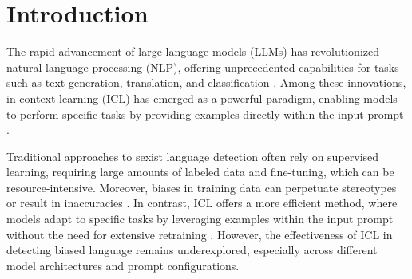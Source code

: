\documentclass[11pt]{article}
\begin{document}


\section{Introduction}
\label{sec:introduction}

The rapid advancement of large language models (LLMs) has revolutionized natural language processing (NLP), offering unprecedented capabilities for tasks such as text generation, translation, and classification \citep{brown2020language, devlin2019bert}. Among these innovations, in-context learning (ICL) has emerged as a powerful paradigm, enabling models to perform specific tasks by providing examples directly within the input prompt \citep{dong2022survey}.

Traditional approaches to sexist language detection often rely on supervised learning, requiring large amounts of labeled data and fine-tuning, which can be resource-intensive. Moreover, biases in training data can perpetuate stereotypes or result in inaccuracies \citep{gpt3}. In contrast, ICL offers a more efficient method, where models adapt to specific tasks by leveraging examples within the input prompt without the need for extensive retraining \citep{min2022rethinking, zhao2021calibrate}. However, the effectiveness of ICL in detecting biased language remains underexplored, especially across different model architectures and prompt configurations.
\end{document}
